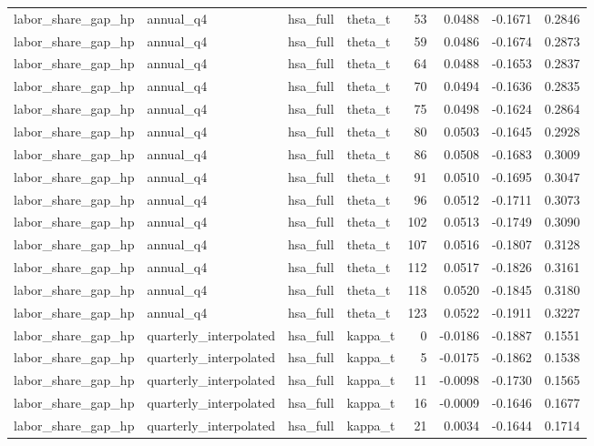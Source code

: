 \begin{tabular}{llllrrrr}
labor\_share\_gap\_hp & annual\_q4 & hsa\_full & theta\_t & 53 & 0.0488 & -0.1671 & 0.2846 \\
labor\_share\_gap\_hp & annual\_q4 & hsa\_full & theta\_t & 59 & 0.0486 & -0.1674 & 0.2873 \\
labor\_share\_gap\_hp & annual\_q4 & hsa\_full & theta\_t & 64 & 0.0488 & -0.1653 & 0.2837 \\
labor\_share\_gap\_hp & annual\_q4 & hsa\_full & theta\_t & 70 & 0.0494 & -0.1636 & 0.2835 \\
labor\_share\_gap\_hp & annual\_q4 & hsa\_full & theta\_t & 75 & 0.0498 & -0.1624 & 0.2864 \\
labor\_share\_gap\_hp & annual\_q4 & hsa\_full & theta\_t & 80 & 0.0503 & -0.1645 & 0.2928 \\
labor\_share\_gap\_hp & annual\_q4 & hsa\_full & theta\_t & 86 & 0.0508 & -0.1683 & 0.3009 \\
labor\_share\_gap\_hp & annual\_q4 & hsa\_full & theta\_t & 91 & 0.0510 & -0.1695 & 0.3047 \\
labor\_share\_gap\_hp & annual\_q4 & hsa\_full & theta\_t & 96 & 0.0512 & -0.1711 & 0.3073 \\
labor\_share\_gap\_hp & annual\_q4 & hsa\_full & theta\_t & 102 & 0.0513 & -0.1749 & 0.3090 \\
labor\_share\_gap\_hp & annual\_q4 & hsa\_full & theta\_t & 107 & 0.0516 & -0.1807 & 0.3128 \\
labor\_share\_gap\_hp & annual\_q4 & hsa\_full & theta\_t & 112 & 0.0517 & -0.1826 & 0.3161 \\
labor\_share\_gap\_hp & annual\_q4 & hsa\_full & theta\_t & 118 & 0.0520 & -0.1845 & 0.3180 \\
labor\_share\_gap\_hp & annual\_q4 & hsa\_full & theta\_t & 123 & 0.0522 & -0.1911 & 0.3227 \\
labor\_share\_gap\_hp & quarterly\_interpolated & hsa\_full & kappa\_t & 0 & -0.0186 & -0.1887 & 0.1551 \\
labor\_share\_gap\_hp & quarterly\_interpolated & hsa\_full & kappa\_t & 5 & -0.0175 & -0.1862 & 0.1538 \\
labor\_share\_gap\_hp & quarterly\_interpolated & hsa\_full & kappa\_t & 11 & -0.0098 & -0.1730 & 0.1565 \\
labor\_share\_gap\_hp & quarterly\_interpolated & hsa\_full & kappa\_t & 16 & -0.0009 & -0.1646 & 0.1677 \\
labor\_share\_gap\_hp & quarterly\_interpolated & hsa\_full & kappa\_t & 21 & 0.0034 & -0.1644 & 0.1714 \\

\end{tabular}
